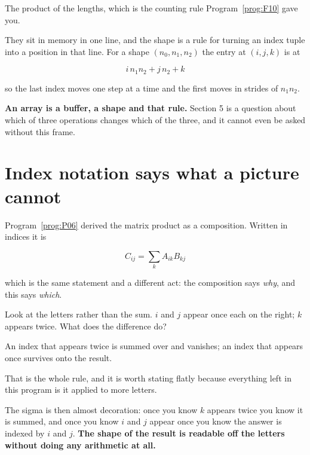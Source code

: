 \begin{fr}
The product of the lengths, which is the counting rule Program~\ref{prog:F10}
gave you.

They sit in memory in one line, and the shape is a rule for turning an index
tuple into a position in that line. For a shape $(n_0, n_1, n_2)$ the entry at
$(i, j, k)$ is at

\[ i \, n_1 n_2 + j \, n_2 + k \]

so the last index moves one step at a time and the first moves in strides of
$n_1 n_2$.

\textbf{An array is a buffer, a shape and that rule.} Section 5 is a question
about which of three operations changes which of the three, and it cannot even
be asked without this frame.
\end{fr}


\section{Index notation says what a picture cannot}
\label{sec:P07-indices}

\begin{fr}
Program~\ref{prog:P06} derived the matrix product as a composition. Written in
indices it is

\[ C_{ij} = \sum_k A_{ik} B_{kj} \]

which is the same statement and a different act: the composition says
\emph{why}, and this says \emph{which}.

Look at the letters rather than the sum. $i$ and $j$ appear once each on the
right; $k$ appears twice. What does the difference do?
\dotline
\nextframe
\end{fr}

\begin{fr}
\begin{ansblock}
An index that appears twice is summed over and vanishes; an index that appears
once survives onto the result.
\end{ansblock}

That is the whole rule, and it is worth stating flatly because everything left
in this program is it applied to more letters.

The sigma is then almost decoration: once you know $k$ appears twice you know
it is summed, and once you know $i$ and $j$ appear once you know the answer is
indexed by $i$ and $j$. \textbf{The shape of the result is readable off the
letters without doing any arithmetic at all.}
\end{fr}

